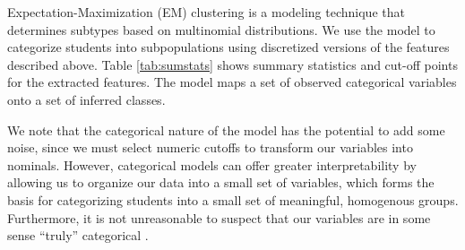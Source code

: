 \documentclass{edm_template}
\begin{document}
Expectation-Maximization (EM) clustering is a modeling technique that determines subtypes based on multinomial distributions. We use the model to categorize students into subpopulations using discretized versions of the features described above. Table \ref{tab:sumstats} shows summary statistics and cut-off points for the extracted features. The model maps a set of observed categorical variables onto a set of inferred classes. 

We note that the categorical nature of the model has the potential to add some noise, since we must select numeric cutoffs to transform our variables into nominals. However, categorical models can offer greater interpretability by allowing us to organize our data into a small set of variables, which forms the basis for categorizing students into a small set of meaningful, homogenous groups. Furthermore, it is not unreasonable to suspect that our variables are in some sense ``truly'' categorical \cite[pp8--9]{Collins2009}. 


\end{document}
